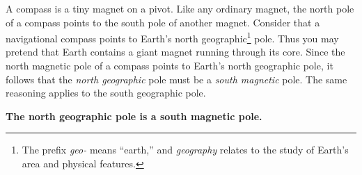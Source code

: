 \documentclass[main.tex]{subfiles}
\begin{document}
\vspace{1em}

A compass is a tiny magnet on a pivot. Like any ordinary magnet, the north pole of a compass points to the south pole of another magnet. Consider that a navigational compass points to Earth's north geographic\footnote{The prefix \textit{geo-} means ``earth,'' and \textit{geography} relates to the study of Earth's area and physical features.} pole. Thus you may pretend that Earth contains a giant magnet running through its core. Since the north magnetic pole of a compass points to Earth's north geographic pole, it follows that the \textit{north geographic} pole must be a \textit{south magnetic} pole. The same reasoning applies to the south geographic pole.

\begin{mdframed}[backgroundcolor=black!10]
\centering
    \textbf{The north geographic pole is a south magnetic pole.}
\end{mdframed}

\vspace{-1cm}

\begin{center}
\vspace{-1cm}
\captionsetup{type=figure,margin=1in}
\end{center}
\end{document}
